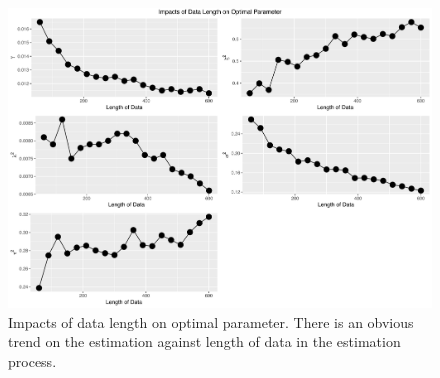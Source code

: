 \begin{figure}[h]
\centering
\includegraphics[width=\textwidth,height=0.5\textheight]{Chapters/05MCMCOU/plots/realdatalengthcompare.pdf}
\caption{Impacts of data length on optimal parameter. There is an obvious trend on the estimation against length of data in the estimation process. }
\end{figure}



